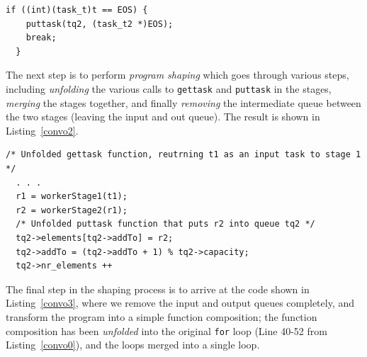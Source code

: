 \begin{lstlisting}[label=convo1, caption={Convolution, Repaired with a Termination Token},frame=single]
  if ((int)(task_t)t == EOS) {
    puttask(tq2, (task_t2 *)EOS);
    break;
  }
  \end{lstlisting}


\noindent
The next step is to perform \emph{program shaping} which goes through various steps, including \emph{unfolding} the various calls to \lstinline{gettask} and \lstinline{puttask} in the stages, \emph{merging} the stages together, and finally \emph{removing} the intermediate queue between the two stages (leaving the input and out queue). The result is shown in Listing~\ref{convo2}.

\begin{lstlisting}[label=convo2, caption={Stages merged, unfolded and intermediate queue removed},frame=single]
  /* Unfolded gettask function, reutrning t1 as an input task to stage 1 */
  . . .
  r1 = workerStage1(t1);
  r2 = workerStage2(r1);
  /* Unfolded puttask function that puts r2 into queue tq2 */
  tq2->elements[tq2->addTo] = r2;
  tq2->addTo = (tq2->addTo + 1) % tq2->capacity;
  tq2->nr_elements ++
\end{lstlisting}

The final step in the shaping process is to arrive at the code shown in Listing~\ref{convo3}, where we remove the input and output queues completely, and transform the program into a simple function composition; the function composition has been \emph{unfolded} into the original \lstinline{for} loop (Line 40-52 from Listing~\ref{convo0}), and the loops merged into a single loop. 


